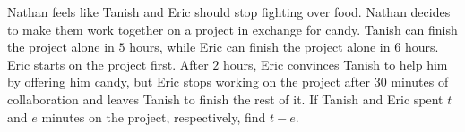 Nathan feels like Tanish and Eric should stop fighting over food. Nathan decides to make them work together on a project in exchange for candy. Tanish can finish the project alone in $5$ hours, while Eric can finish the project alone in $6$ hours. Eric starts on the project first. After $2$ hours, Eric convinces Tanish to help him by offering him candy, but Eric stops working on the project after $30$ minutes of collaboration and leaves Tanish to finish the rest of it. If Tanish and Eric spent $t$ and $e$ minutes on the project, respectively, find $t- e$.
